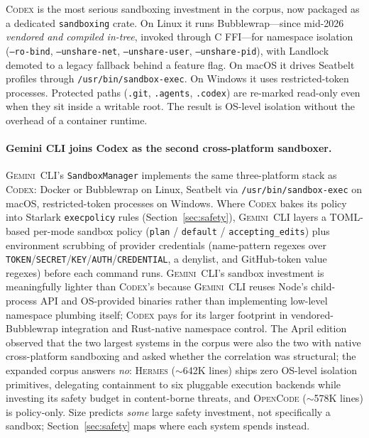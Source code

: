 \documentclass[11pt,a4paper]{article}
\newcommand{\cdx}{\textsc{Codex}\xspace}
\newcommand{\gemini}{\textsc{Gemini~CLI}\xspace}
\newcommand{\hrm}{\textsc{Hermes}\xspace}
\newcommand{\ocd}{\textsc{OpenCode}\xspace}
\begin{document}
\cdx{} is the most serious sandboxing investment in the corpus, now packaged as a dedicated \texttt{sandboxing} crate.
On Linux it runs Bubblewrap---since mid-2026 \emph{vendored and compiled in-tree}, invoked through C FFI---for namespace isolation (\texttt{--ro-bind}, \texttt{--unshare-net}, \texttt{--unshare-user}, \texttt{--unshare-pid}), with Landlock demoted to a legacy fallback behind a feature flag.
On macOS it drives Seatbelt profiles through \texttt{/usr/bin/sandbox-exec}.
On Windows it uses restricted-token processes.
Protected paths (\texttt{.git}, \texttt{.agents}, \texttt{.codex}) are re-marked read-only even when they sit inside a writable root.
The result is OS-level isolation without the overhead of a container runtime.

\paragraph{Gemini CLI joins Codex as the second cross-platform sandboxer.}
\gemini{}'s \texttt{SandboxManager} implements the same three-platform stack as \cdx{}: Docker or Bubblewrap on Linux, Seatbelt via \texttt{/usr/bin/sandbox-exec} on macOS, restricted-token processes on Windows.
Where \cdx{} bakes its policy into Starlark \texttt{execpolicy} rules (Section~\ref{sec:safety}), \gemini{} layers a TOML-based per-mode sandbox policy (\texttt{plan} / \texttt{default} / \texttt{accepting\_edits}) plus environment scrubbing of provider credentials (name-pattern regexes over \texttt{TOKEN}/\texttt{SECRET}/\texttt{KEY}/\texttt{AUTH}/\texttt{CREDENTIAL}, a denylist, and GitHub-token value regexes) before each command runs.
\gemini{}'s sandbox investment is meaningfully lighter than \cdx{}'s because \gemini{} reuses Node's child-process API and OS-provided binaries rather than implementing low-level namespace plumbing itself; \cdx{} pays for its larger footprint in vendored-Bubblewrap integration and Rust-native namespace control.
The April edition observed that the two largest systems in the corpus were also the two with native cross-platform sandboxing and asked whether the correlation was structural; the expanded corpus answers \emph{no}: \hrm{} ($\sim$642K lines) ships zero OS-level isolation primitives, delegating containment to six pluggable execution backends while investing its safety budget in content-borne threats, and \ocd{} ($\sim$578K lines) is policy-only.
Size predicts \emph{some} large safety investment, not specifically a sandbox; Section~\ref{sec:safety} maps where each system spends instead.
\end{document}
